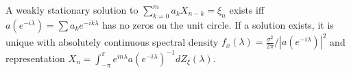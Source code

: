 A weakly stationary solution to $\sum_{k=0}^m a_k X_{n-k} = \xi_n$ exists iff $a(e^{-i\lambda}) = \sum a_k e^{-ik\lambda}$ has no zeros on the unit circle. If a solution exists, it is unique with absolutely continuous spectral density $f_x(\lambda) = \frac{\sigma^2}{2\pi} / |a(e^{-i\lambda})|^2$ and representation $X_n = \int_{-\pi}^\pi e^{in\lambda} a(e^{-i\lambda})^{-1} dZ_\xi(\lambda)$.
